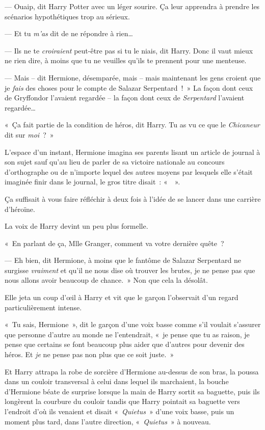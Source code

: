 --- Ouaip, dit Harry Potter avec un léger sourire. Ça leur apprendra à prendre les scénarios hypothétiques trop au sérieux.

--- Et tu \emph{m'as} dit de ne répondre à rien…

--- Ils ne te \emph{croiraient} peut-être pas si tu le niais, dit Harry. Donc il vaut mieux ne rien dire, à moins que tu ne veuilles qu'ils te prennent pour une menteuse.

--- Mais -- dit Hermione, désemparée, mais -- mais maintenant les gens croient que je \emph{fais} des choses pour le compte de Salazar Serpentard~!~» La façon dont ceux de Gryffondor l'avaient regardée -- la façon dont ceux de \emph{Serpentard} l'avaient regardée…

«~Ça fait partie de la condition de héros, dit Harry. Tu as vu ce que le \emph{Chicaneur} dit sur \emph{moi}~?~»

L'espace d'un instant, Hermione imagina ses parents lisant un article de journal à son sujet sauf qu'au lieu de parler de sa victoire nationale au concours d'orthographe ou de n'importe lequel des autres moyens par lesquels elle s'était imaginée finir dans le journal, le gros titre disait~: «~~».

Ça suffisait à vous faire réfléchir à deux fois à l'idée de se lancer dans une carrière d'héroïne.

La voix de Harry devint un peu plus formelle.

«~En parlant de ça, Mlle Granger, comment va votre dernière quête~?

--- Eh bien, dit Hermione, à moins que le fantôme de Salazar Serpentard ne surgisse \emph{vraiment} et qu'il ne nous dise où trouver les brutes, je ne pense pas que nous allons avoir beaucoup de chance.~» Non que cela la désolât.

Elle jeta un coup d'œil à Harry et vit que le garçon l'observait d'un regard particulièrement intense.

«~Tu sais, Hermione~», dit le garçon d'une voix basse comme s'il voulait s'assurer que personne d'autre au monde ne l'entendrait, «~je pense que tu as raison, je pense que certains se font beaucoup plus aider que d'autres pour devenir des héros. Et \emph{je} ne pense pas non plus que ce soit juste.~»

Et Harry attrapa la robe de sorcière d'Hermione au-dessus de son bras, la poussa dans un couloir transversal à celui dans lequel ils marchaient, la bouche d'Hermione béate de surprise lorsque la main de Harry sortit sa baguette, puis ils longèrent la courbure du couloir tandis que Harry pointait sa baguette vers l'endroit d'où ils venaient et disait «~\emph{Quietus}~» d'une voix basse, puis un moment plus tard, dans l'autre direction, «~\emph{Quietus}~» à nouveau.

